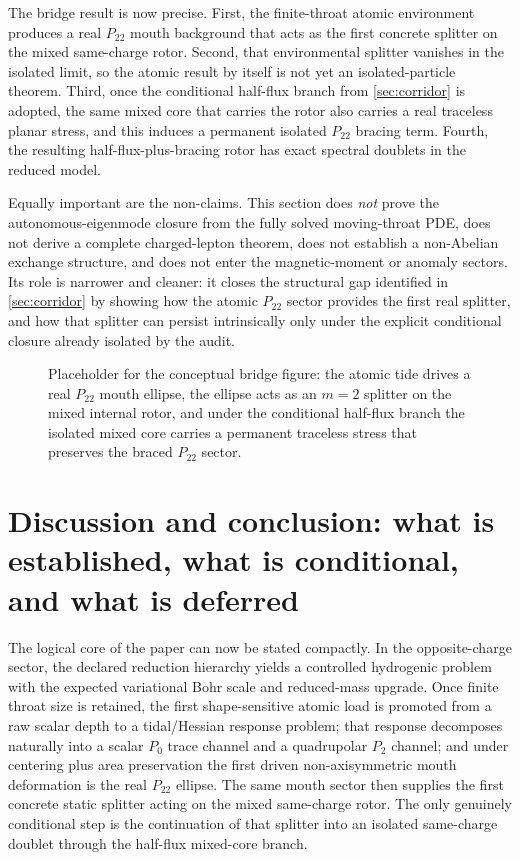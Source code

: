 \documentclass[11pt]{article}
\theoremstyle{plain}
\theoremstyle{definition}
\theoremstyle{remark}
\newcommand{\Ptwotwo}{P_{22}}
\begin{document}
The bridge result is now precise. First, the finite-throat atomic environment produces a real \(\Ptwotwo\) mouth background that acts as the first concrete splitter on the mixed same-charge rotor. Second, that environmental splitter vanishes in the isolated limit, so the atomic result by itself is not yet an isolated-particle theorem. Third, once the conditional half-flux branch from \cref{sec:corridor} is adopted, the same mixed core that carries the rotor also carries a real traceless planar stress, and this induces a permanent isolated \(\Ptwotwo\) bracing term. Fourth, the resulting half-flux-plus-bracing rotor has exact spectral doublets in the reduced model.

Equally important are the non-claims. This section does \emph{not} prove the autonomous-eigenmode closure from the fully solved moving-throat PDE, does not derive a complete charged-lepton theorem, does not establish a non-Abelian exchange structure, and does not enter the magnetic-moment or anomaly sectors. Its role is narrower and cleaner: it closes the structural gap identified in \cref{sec:corridor} by showing how the atomic \(\Ptwotwo\) sector provides the first real splitter, and how that splitter can persist intrinsically only under the explicit conditional closure already isolated by the audit.

\begin{figure}[t]
    \centering
    \fbox{\rule{0pt}{1.8in}\rule{0.92\linewidth}{0pt}}
    \caption{Placeholder for the conceptual bridge figure: the atomic tide drives a real \(\Ptwotwo\) mouth ellipse, the ellipse acts as an \(m=2\) splitter on the mixed internal rotor, and under the conditional half-flux branch the isolated mixed core carries a permanent traceless stress that preserves the braced \(\Ptwotwo\) sector.}
    \label{fig:bridge}
\end{figure}

\section{Discussion and conclusion: what is established, what is conditional, and what is deferred}\label{sec:discussion}

The logical core of the paper can now be stated compactly. In the opposite-charge sector, the declared reduction hierarchy yields a controlled hydrogenic problem with the expected variational Bohr scale and reduced-mass upgrade. Once finite throat size is retained, the first shape-sensitive atomic load is promoted from a raw scalar depth to a tidal/Hessian response problem; that response decomposes naturally into a scalar $P_0$ trace channel and a quadrupolar $P_2$ channel; and under centering plus area preservation the first driven non-axisymmetric mouth deformation is the real \(\Ptwotwo\) ellipse. The same mouth sector then supplies the first concrete static splitter acting on the mixed same-charge rotor. The only genuinely conditional step is the continuation of that splitter into an isolated same-charge doublet through the half-flux mixed-core branch.
\end{document}
